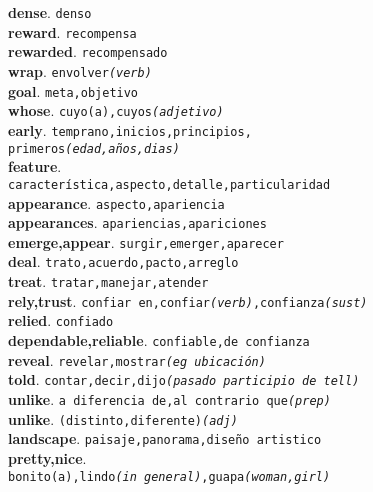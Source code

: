 \documentclass[twocolumn]{article}
\begin{document}
	\textsf{\textbf{dense}}. \texttt{denso}\\
	\textsf{\textbf{reward}}. \texttt{recompensa}\\
	\textsf{\textbf{rewarded}}. \texttt{recompensado}\\
	\textsf{\textbf{wrap}}. \texttt{envolver{\scriptsize \textsl{(verb)}}}\\
	\textsf{\textbf{goal}}. \texttt{meta,objetivo}\\
	\textsf{\textbf{whose}}. \texttt{cuyo(a),cuyos{\scriptsize \textsl{(adjetivo)}}}\\
	\textsf{\textbf{early}}. \texttt{temprano,inicios,principios,\\primeros{\scriptsize \textsl{(edad,a\~nos,dias)}}}\\
	\textsf{\textbf{feature}}.\\\texttt{caracter\'istica,aspecto,detalle,particularidad}\\
	\textsf{\textbf{appearance}}. \texttt{aspecto,apariencia}\\
	\textsf{\textbf{appearances}}. \texttt{apariencias,apariciones}\\
	\textsf{\textbf{emerge,appear}}. \texttt{surgir,emerger,aparecer}\\
	\textsf{\textbf{deal}}. \texttt{trato,acuerdo,pacto,arreglo}\\
	\textsf{\textbf{treat}}. \texttt{tratar,manejar,atender}\\
	\textsf{\textbf{rely,trust}}. \texttt{confiar en,confiar{\scriptsize \textsl{(verb)}},confianza{\scriptsize \textsl{(sust)}}}\\
	\textsf{\textbf{relied}}. \texttt{confiado}\\
	\textsf{\textbf{dependable,reliable}}. \texttt{confiable,de confianza}\\
	\textsf{\textbf{reveal}}. \texttt{revelar,mostrar{\scriptsize \textsl{(eg ubicaci\'on)}}}\\
	\textsf{\textbf{told}}. \texttt{contar,decir,dijo{\scriptsize \textsl{(pasado participio de tell)}}}\\
	\textsf{\textbf{unlike}}. \texttt{a diferencia de,al contrario que{\scriptsize \textsl{(prep)}}}\\
	\textsf{\textbf{unlike}}. \texttt{(distinto,diferente){\scriptsize \textsl{(adj)}}}\\
	\textsf{\textbf{landscape}}. \texttt{paisaje,panorama,dise\~no artistico}\\
	\textsf{\textbf{pretty,nice}}.\\\texttt{bonito(a),lindo{\scriptsize \textsl{(in general)}},guapa{\scriptsize \textsl{(woman,girl)}}}\\
\end{document}
